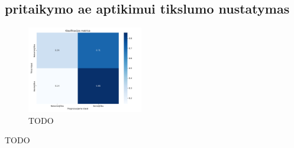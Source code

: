 \subsection{\LIME pritaikymo \gls{ae} aptikimui tikslumo nustatymas}

\TODO

\begin{figure}[h]
    \centering
    \includegraphics[width=0.45\textwidth]{images/lime_2x2.png}
    \caption{TODO}
    \label{fig:exp2:confusion}
\end{figure}

\begin{table}[h]
    \caption{TODO}
    \centering
    \label{tbl:exp2:metrics}
\end{table}


